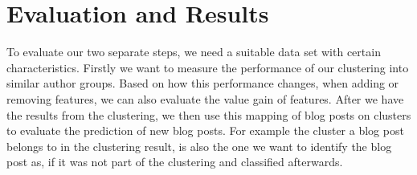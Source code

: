 \section{Evaluation and Results}
\label{sec:results}


To evaluate our two separate steps, we need a suitable data set with certain characteristics.
Firstly we want to measure the performance of our clustering into similar author groups.
Based on how this performance changes, when adding or removing features, we can also evaluate the value gain of features.
After we have the results from the clustering, we then use this mapping of blog posts on clusters to evaluate the prediction of new blog posts.
For example the cluster a blog post belongs to in the clustering result, is also the one we want to identify the blog post as, if it was not part of the clustering and classified afterwards.





